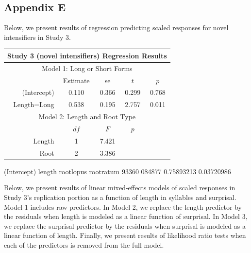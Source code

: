 \subsection{Appendix E}

Below, we present results of regression predicting scaled responses for novel intensifiers in Study 3.

\vspace{4mm}

\noindent
\footnotesize{
\begin{tabular}{r|cccc}
\hline
\hline
\multicolumn{5}{c}{\textbf{Study 3 (novel intensifiers) Regression Results}} \\
\hline
\hline
\multicolumn{5}{c}{Model 1: Long or Short Forms} \\
& Estimate & se & $t$ & $p$ \\
\hline
(Intercept) &  0.110 & 0.366 & 0.299 & 0.768 \\
Length=Long &  0.538 & 0.195 & 2.757 & 0.011 \\
\hline
\hline
\multicolumn{5}{c}{Model 2: Length and Root Type} \\
& $df$ & $F$ & $p$ \\
\hline
Length & 1 & 7.421 & \\
Root & 2 & 3.386 & \\
\hline
\hline
\end{tabular}
}

(Intercept)      length   rootlopus   rootratum 
 93360  084877  0.75893213  0.03720986 

\vspace{4mm}


Below, we present results of linear mixed-effects models of scaled responses in Study 3's replication portion as a function of length in syllables and surprisal.
Model 1 includes raw predictors.
In Model 2, we replace the length predictor by the residuals when length is modeled as a linear function of surprisal.
In Model 3, we replace the surprisal predictor by the residuals when surprisal is modeled as a linear function of length.
Finally, we present results of likelihood ratio tests when each of the predictors is removed from the full model.

\vspace{4mm}

